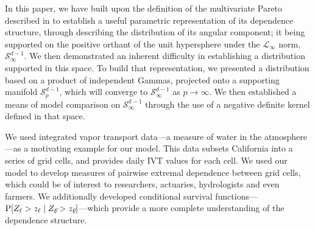 In this paper, we have built upon the definition of the multivariate Pareto described in \cite{ferreira2014}
  to establish a useful parametric representation of its dependence structure, through describing
  the distribution of its angular component; it being supported on the positive orthant of the unit
  hypersphere under the $\mathcal{L}_{\infty}$ norm, $\mathcal{S}_{\infty}^{d-1}$.  We then demonstrated an
  inherent difficulty in establishing a distribution supported in this space.  To build that representation,
  we presented a distribution based on a product of independent Gammas, projected onto a supporting manifold
  $\mathcal{S}_{p}^{d-1}$, which will converge to $\mathcal{S}_{\infty}^{d-1}$ as $p\to\infty$.  We then
  established a means of model comparison on $\mathcal{S}_{\infty}^{d-1}$ through the use of a negative
  definite kernel defined in that space.

We used integrated vapor transport data---a measure of water in the atmosphere---as a motivating example for
  our model.  This data subsets California into a series of grid cells, and provides daily IVT values for
  each cell.  We used our model to develop measures of pairwise extremal dependence between grid cells, which
  could be of interest to researchers, actuaries, hydrologists and even farmers.  We additionally developed
  conditional survival functions---$\text{P}\left[Z_{\ell} > z_{\ell}\mid Z_{\not\ell} > z_{\not\ell}\right]$---which
  provide a more complete understanding of the dependence structure.

